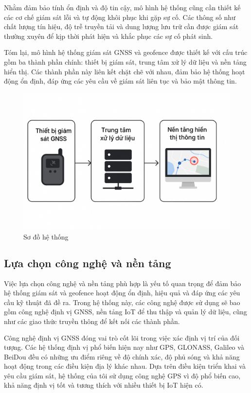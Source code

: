 \documentclass[../DoAn.tex]{subfiles}
\begin{document}
Nhằm đảm bảo tính ổn định và độ tin cậy, mô hình hệ thống cũng cần thiết kế các cơ chế giám sát lỗi và tự động khôi phục khi gặp sự cố. Các thông số như chất lượng tín hiệu, độ trễ truyền tải và dung lượng lưu trữ cần được giám sát thường xuyên để kịp thời phát hiện và khắc phục các sự cố phát sinh.

Tóm lại, mô hình hệ thống giám sát GNSS và geofence được thiết kế với cấu trúc gồm ba thành phần chính: thiết bị giám sát, trung tâm xử lý dữ liệu và nền tảng hiển thị. Các thành phần này liên kết chặt chẽ với nhau, đảm bảo hệ thống hoạt động ổn định, đáp ứng các yêu cầu về giám sát liên tục và bảo mật thông tin.
\begin{figure}[H]
    \includegraphics[width=\linewidth]{Hinhve/system_diagram.png}
    \caption{Sơ đồ hệ thống}
    \label{fig:label}
\end{figure}
\subsection{Lựa chọn công nghệ và nền tảng}
\label{subsection:2.2.2}
Việc lựa chọn công nghệ và nền tảng phù hợp là yếu tố quan trọng để đảm bảo hệ thống giám sát và geofence hoạt động ổn định, hiệu quả và đáp ứng các yêu cầu kỹ thuật đã đề ra. Trong hệ thống này, các công nghệ được sử dụng sẽ bao gồm công nghệ định vị GNSS, nền tảng IoT để thu thập và quản lý dữ liệu, cũng như các giao thức truyền thông để kết nối các thành phần.

Công nghệ định vị GNSS đóng vai trò cốt lõi trong việc xác định vị trí của đối tượng. Các hệ thống định vị phổ biến hiện nay như GPS, GLONASS, Galileo và BeiDou đều có những ưu điểm riêng về độ chính xác, độ phủ sóng và khả năng hoạt động trong các điều kiện địa lý khác nhau. Dựa trên điều kiện triển khai và yêu cầu giám sát, hệ thống của tôi sử dụng công nghệ GPS vì độ phổ biến cao, khả năng định vị tốt và tương thích với nhiều thiết bị IoT hiện có.
\end{document}
